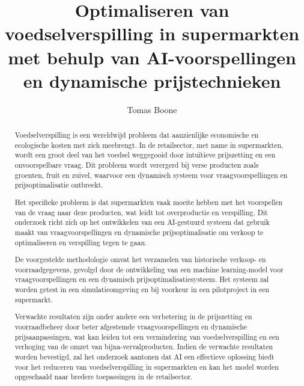 \documentclass{hogent-article}
\title{Optimaliseren van voedselverspilling in supermarkten met behulp van AI-voorspellingen en dynamische prijstechnieken}
\author{Tomas Boone}
\begin{document}
    \begin{abstract}

Voedselverspilling is een wereldwijd probleem dat aanzienlijke economische en ecologische kosten met zich meebrengt.
In de retailsector, met name in supermarkten, wordt een groot deel van het voedsel weggegooid door intuïtieve prijszetting en een onvoorspelbare vraag.
Dit probleem wordt verergerd bij verse producten zoals groenten, fruit en zuivel, waarvoor een dynamisch systeem voor vraagvoorspellingen en prijsoptimalisatie ontbreekt.

Het specifieke probleem is dat supermarkten vaak moeite hebben met het voorspellen van de vraag naar deze producten, wat leidt tot overproductie en verspilling.
Dit onderzoek richt zich op het ontwikkelen van een AI-gestuurd systeem dat gebruik maakt van vraagvoorspellingen en dynamische prijsoptimalisatie om verkoop te optimaliseren en verspilling tegen te gaan.

De voorgestelde methodologie omvat het verzamelen van historische verkoop- en voorraadgegevens, gevolgd door de ontwikkeling van een machine learning-model voor vraagvoorspellingen en een dynamisch prijsoptimalisatiesysteem.
Het systeem zal worden getest in een simulatieomgeving en bij voorkeur in een pilotproject in een supermarkt.

Verwachte resultaten zijn onder andere een verbetering in de prijszetting en voorraadbeheer door beter afgestemde vraagvoorspellingen en dynamische prijsaanpassingen,
wat kan leiden tot een vermindering van voedselverspilling en een verhoging van de omzet van bijna-vervalproducten.
Indien de verwachte resultaten worden bevestigd, zal het onderzoek aantonen dat AI een effectieve oplossing biedt voor het reduceren van voedselverspilling in supermarkten en kan het model worden opgeschaald naar bredere toepassingen in de retailsector.

    \end{abstract}

    \tableofcontents

    

    \printbibliography[heading=bibintoc]
\end{document}

